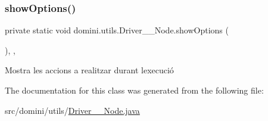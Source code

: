 \mbox{\label{classdomini_1_1utils_1_1Driver____Node_a3e1022f470676f7cbbeb44b9b2d4f66f}} 
\subsubsection{\texorpdfstring{show\+Options()}{showOptions()}}
{\footnotesize\ttfamily private static void domini.\+utils.\+Driver\+\_\+\+\_\+\+Node.\+show\+Options (\begin{DoxyParamCaption}{ }\end{DoxyParamCaption})\hspace{0.3cm}{\ttfamily [inline]}, {\ttfamily [static]}, {\ttfamily [private]}}



Mostra les accions a realitzar durant l\textquotesingle{}execució 



The documentation for this class was generated from the following file\+:\begin{DoxyCompactItemize}
\item 
src/domini/utils/\hyperlink{Driver____Node_8java}{Driver\+\_\+\+\_\+\+Node.\+java}\end{DoxyCompactItemize}
